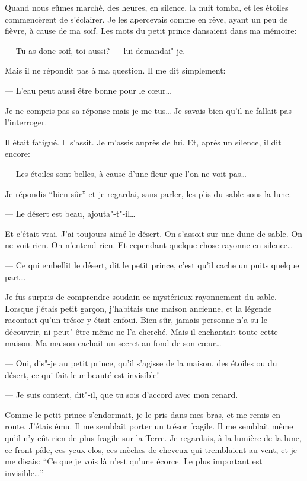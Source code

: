 Quand nous eûmes marché, des heures, en silence, la nuit tomba, et les étoiles
commencèrent de s'éclairer. Je les apercevais comme en rêve, ayant un peu de fièvre,
à cause de ma soif. Les mots du petit prince dansaient dans ma mémoire:

--- Tu as donc soif, toi aussi? --- lui demandai"-je.

Mais il ne répondit pas à ma question. Il me dit simplement:

--- L'eau peut aussi être bonne pour le cœur\ldots{}

Je ne compris pas sa réponse mais je me tus\ldots{} Je savais bien qu'il ne fallait
pas l'interroger.

Il était fatigué. Il s'assit. Je m'assis auprès de lui. Et, après un silence, il dit
encore:

--- Les étoiles sont belles, à cause d'une fleur que l'on ne voit pas\ldots{}

Je répondis ``bien sûr'' et je regardai, sans parler, les plis du sable sous la lune.

--- Le désert est beau, ajouta"-t"-il\ldots{}

Et c'était vrai. J'ai toujours aimé le désert. On s'assoit sur une dune de sable. On
ne voit rien. On n'entend rien. Et cependant quelque chose rayonne en silence\ldots{}

--- Ce qui embellit le désert, dit le petit prince, c'est qu'il cache un puits
quelque part\ldots{}

Je fus surpris de comprendre soudain ce mystérieux rayonnement du sable. Lorsque
j'étais petit garçon, j'habitais une maison ancienne, et la légende racontait qu’un
trésor y était enfoui. Bien sûr, jamais personne n'a su le découvrir, ni peut"-être
même ne l'a cherché. Mais il enchantait toute cette maison. Ma maison cachait un
secret au fond de son cœur\ldots{}

--- Oui, dis"-je au petit prince, qu'il s'agisse de la maison, des étoiles ou du
désert, ce qui fait leur beauté est invisible!

--- Je suis content, dit"-il, que tu sois d'accord avec mon renard.

Comme le petit prince s'endormait, je le pris dans mes bras, et me remis en route.
J'étais ému. Il me semblait porter un trésor fragile. Il me semblait même qu'il n'y
eût rien de plus fragile sur la Terre. Je regardais, à la lumière de la lune, ce
front pâle, ces yeux clos, ces mèches de cheveux qui tremblaient au vent, et je me
disais: ``Ce que je vois là n'est qu'une écorce. Le plus important est invisible\ldots{}''

